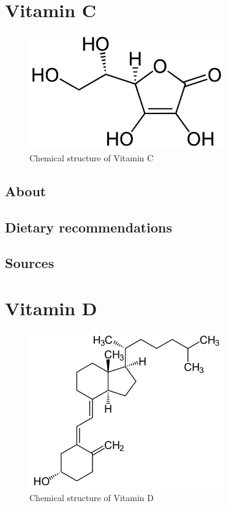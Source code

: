 \documentclass{book}
\begin{document}
\chapter{Vitamin C}
\begin{figure}[h]
	\caption{Chemical structure of Vitamin C}
	\centering \includegraphics[width=0.75\textwidth]{images/Vitamin_C_chemical_structure}
\end{figure}
\newpage

\section{About}


\section{Dietary recommendations}


\section{Sources}


\chapter{Vitamin D}
\begin{figure}[h]
	\caption{Chemical structure of Vitamin D}
	\centering \includegraphics[width=0.75\textwidth]{images/Vitamin_D_chemical_structure}
\end{figure}
\newpage
\end{document}
